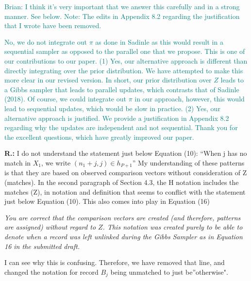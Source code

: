 \documentclass[letterpaper, parskip]{scrartcl}
\newcommand{\pointRaised}[2]{%
	\textbf{#1.\theresponsectr:} #2
}
\newcounter{responsectr}[section]     %
\newcommand{\reply}[1]{%
	\refstepcounter{responsectr}%
		\begin{tcolorbox}
			\itshape #1
		\end{tcolorbox}
}
\begin{document}
\textcolor{teal}{Brian: I think it's very important that we answer this carefully and in a strong manner. See below. Note: The edits in Appendix 8.2 regarding the justification that I wrote have been removed.}

\textcolor{teal}{No, we do not integrate out $\pi$ as done in Sadinle as this would result in a sequential sampler as opposed to the parallel one that we propose. This is one of our contributions to our paper. (1) Yes, our alternative approach is different than directly integrating over the prior distribution. We have attempted to make this more clear in our revised version. In short, our prior distribution over $Z$ leads to a Gibbs sampler that leads to parallel updates, which contrasts that of Sadinle (2018). Of course, we could integrate out $\pi$ in our approach, however, this would lead to sequential updates, which would be slow in practice. (2) Yes, our alternative approach is justified. We provide a justification in Appendix 8.2 regarding why the updates are independent and not sequential. Thank you for the excellent questions, which have greatly improved our paper. }



%
%	
%

\pointRaised{R}{%
	I do not understand the statement just below Equation (10): “When j has no match in $X_1$, we write $(n_1 +j, j) \in h_{P+1}$” My understanding of these patterns is that they are based on observed comparison vectors without consideration of Z (matches). In the second paragraph of Section 4.3, the H notation includes the matches (Z), in notation and definition that seems to conflict with the statement just below Equation (10). This also comes into play in Equation (16)}

	\reply{%
	You are correct that the comparison vectors are created (and therefore, patterns are assigned) without regard to $Z$. This notation was created purely to be able to denote when a record was left unlinked during the Gibbs Sampler as in Equation 16 in the submitted draft. 
	
	I can see why this is confusing. Therefore, we have removed that line, and changed the notation for record $B_j$ being unmatched to just be''otherwise".
	}
\end{document}
